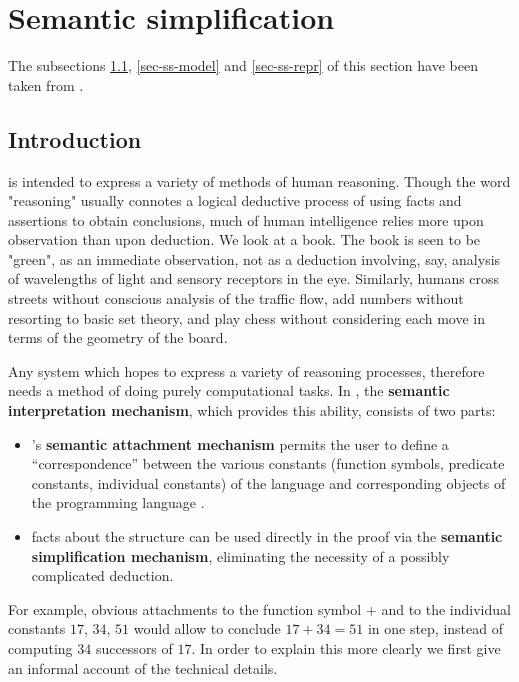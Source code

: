 \section{Semantic simplification}
\label{sec-comp}

The subsections \ref{sec-ss-intro}, \ref{sec-ss-model} and \ref{sec-ss-repr} 
of this section have been taken from \cite{rww3}.


\subsection{Introduction}
\label{sec-ss-intro}

{\GF} is intended to express a variety of methods of human reasoning.
Though the word "reasoning" usually connotes a logical deductive process of 
using facts and assertions to obtain conclusions, much of human intelligence 
relies more upon observation than upon deduction.
We look at a book. The book is seen to be "green", as an immediate observation,
not as a deduction involving, say, analysis of wavelengths of light and 
sensory receptors  in the eye. Similarly, humans cross streets without 
conscious analysis of the traffic flow, add numbers without resorting to basic
set theory, and play chess without considering each move in terms of the 
geometry of the board. 

Any system which hopes to express a variety of reasoning processes, therefore 
needs a method of doing purely computational tasks.
In {\GF}, the {\bf semantic interpretation mechanism}, which provides this 
ability, consists of two parts:
\begin{itemize}
\item {\GF}'s {\bf semantic attachment mechanism} permits the user to define a
      ``correspondence'' between the various constants (function symbols,
      predicate constants, individual constants) of the language and
      corresponding objects of the programming language {\HG}.
\item facts about the {\HG} structure can be used directly in the proof
      via the {\bf semantic simplification mechanism}, eliminating the 
      necessity of a possibly complicated deduction.
\end{itemize}
For example, obvious attachments to the function symbol $+$ and to the 
individual constants $17$, $34$, $51$ would allow to conclude $17+34=51$ in 
one step, instead of computing $34$ successors of $17$.
In order to explain this more clearly we first give an informal account of the 
technical details.

